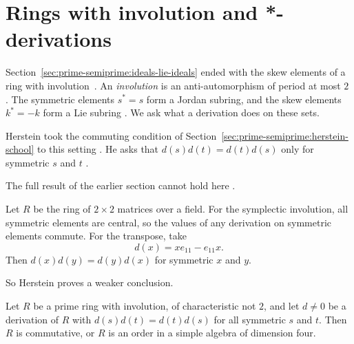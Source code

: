 \section{Rings with involution and *-derivations}\label{sec:prime-semiprime:involution}

Section~\ref{sec:prime-semiprime:ideals-lie-ideals} ended with the skew
elements of a ring with involution~\cite[p.~14]{MartindaleMiers1986}. An \emph{involution} is an
anti-automorphism of period at most $2$ \cite[p.~14]{MartindaleMiers1986}. The
symmetric elements $s^*=s$ form a Jordan subring, and the skew elements
$k^*=-k$ form a Lie subring \cite[p.~14]{MartindaleMiers1986}. We ask what a
derivation does on these sets.

Herstein took the commuting condition of
Section~\ref{sec:prime-semiprime:herstein-school} to this setting
\cite[p.~356]{Herstein1982}. He asks that $d(s)d(t)=d(t)d(s)$ only for
symmetric $s$ and $t$ \cite[p.~356]{Herstein1982}.

The full result of the earlier section cannot hold here
\cite[p.~356]{Herstein1982}.

\begin{example}\label{ex:prime:herstein-symplectic}
Let $R$ be the ring of $2\times 2$ matrices over a field. For the symplectic
involution, all symmetric elements are central, so the values of any derivation
on symmetric elements commute. For the transpose, take
\[
d(x)=xe_{11}-e_{11}x .
\]
Then $d(x)d(y)=d(y)d(x)$ for symmetric $x$ and $y$.
\end{example}

So Herstein proves a weaker
conclusion.

\begin{theorem}\label{thm:prime:herstein-involution}
Let $R$ be a prime ring with involution, of characteristic not $2$, and let
$d\neq 0$ be a derivation of $R$ with $d(s)d(t)=d(t)d(s)$ for all symmetric $s$
and $t$. Then $R$ is commutative, or $R$ is an order in a simple algebra of
dimension four.
\end{theorem}

